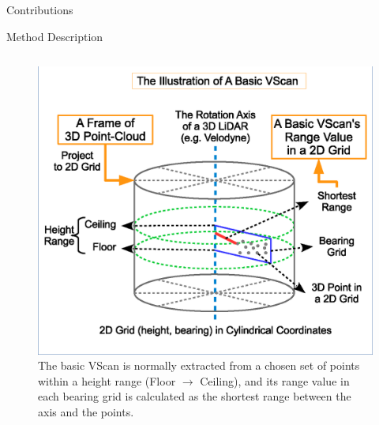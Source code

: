 \documentclass[final,hyperref={pdfpagelabels=false}]{beamer}
\begin{document}
\begin{frame}[t]
\begin{columns}[t]
\begin{column}{0.47\textwidth}
\begin{block}{Contributions}
\end{block}


\begin{block}{Method Description}

\begin{columns}
	\begin{column}{0.46\textwidth}
		\begin{figure}
			\centering
			\includegraphics[width=\textwidth]{grid}
			\caption{The basic VScan is normally extracted from a chosen set of points within a height range (Floor $\rightarrow$ Ceiling), and its range value in each bearing grid is calculated as the shortest range between the axis and the points.}
		\end{figure}
	\end{column}
	

\end{columns}
\end{block}
\end{column}
\end{columns}
\end{frame}
\end{document}
